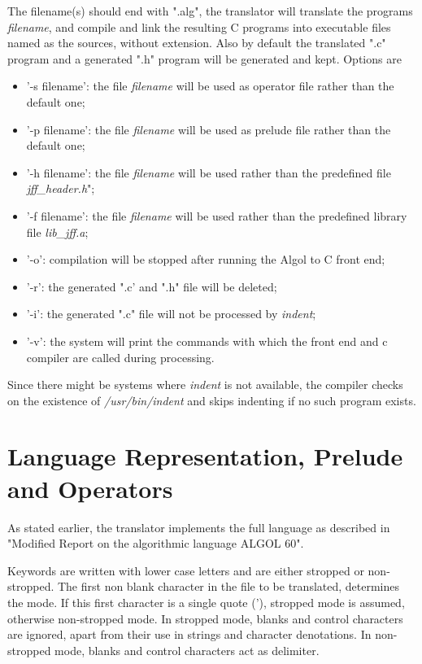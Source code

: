 \documentclass[11pt]{article}
\begin{document}
The filename(s) should end with ".alg", 
the translator will translate the programs {\em filename}, and compile and
link the resulting C programs into executable files named as the sources, without extension. Also by default the translated ".c" program and a generated ".h"
program will be generated and kept.
Options are
\begin{itemize}
\item '-s filename': the file {\em filename} will be used as operator file
rather than the default one;
\item '-p filename': the file {\em filename} will be used as prelude file
rather than the default one;
\item '-h filename': the file {\em filename} will be used rather than the
predefined file {\em jff\_header.h}";
\item '-f filename': the file {\em filename} will be used rather than the
predefined library file {\em lib\_jff.a};
\item '-o': compilation will be stopped after running the Algol to C front end;
\item '-r': the generated ".c' and ".h" file will be deleted;
\item '-i': the generated  ".c" file will not be processed by {\em indent};
\item '-v': the system will print the commands with which the front end and c compiler
are called during processing.
\end{itemize}

Since there might be systems where {\em indent} is not available, the compiler
checks on the existence of {\em /usr/bin/indent} and skips indenting
if no such program exists.

\section{Language Representation, Prelude and Operators}
As stated earlier, the translator implements the full language
as described in "Modified Report on the algorithmic language ALGOL 60".

Keywords are written with lower case letters and are either stropped or non-stropped.
The first non blank character in the file to be translated,
determines the mode.
If this first character is a single quote ('),
stropped mode is assumed, otherwise non-stropped mode.
In stropped mode, blanks and control characters are ignored,
apart from their use in
strings and character denotations.
In non-stropped mode, blanks and control characters act as delimiter.
\end{document}
